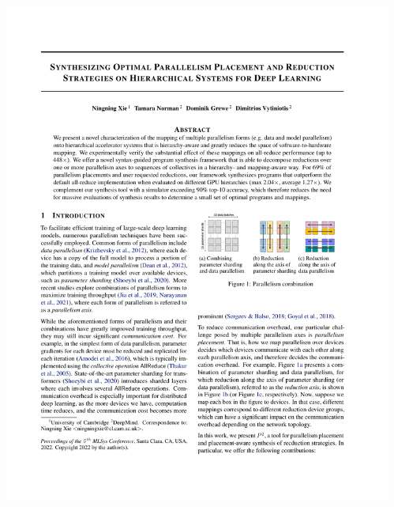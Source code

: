 \documentclass[12pt,aspectratio=169]{beamer}
\begin{document}
\begin{frame}
        \begin{columns}
            \begin{column}{0.55\textwidth}
                \includegraphics[page=7,trim=1.9cm 21cm 11.9cm 2.2cm,clip,scale=0.92]{p2.pdf}
            \end{column}
            \begin{column}{0.45\textwidth}

\end{column}
\end{columns}
\end{frame}
\end{document}
